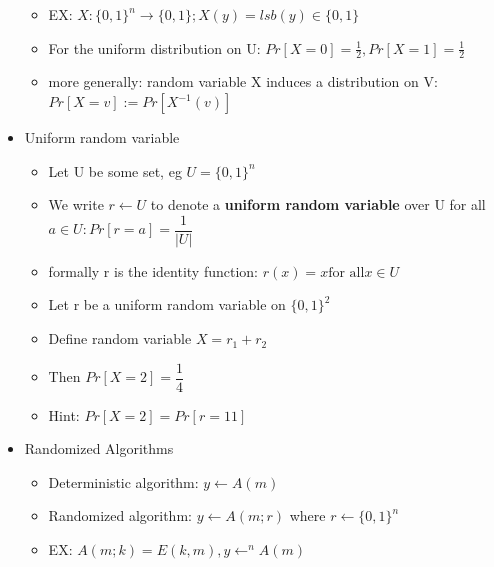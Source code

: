 \documentclass[]{article}
\begin{document}
\begin{itemize}
\begin{itemize}
		\item EX: $X: \{0,1\}^{n} \rightarrow \{0,1\} ; X(y) = lsb(y) \in \{0,1\}$
		\item For the uniform distribution on U: $Pr[X=0] = \frac{1}{2}, Pr[X=1] = \frac{1}{2}$
		\item more generally: random variable X induces a distribution on V: $Pr[X=v] := Pr[X^{-1}(v)]$
	\end{itemize}
	\item Uniform random variable
	\begin{itemize}
		\item Let U be some set, eg $U = \{0,1\}^{n}$
		\item We write $r \leftarrow U $ to denote a \textbf{uniform random variable} over U for all $a \in U: Pr[r=a] = \dfrac{1}{|U|}$
		\item formally r is the identity function: $r(x) = x \text{for all} x \in U$
		\item Let r be a uniform random variable on $\{0,1\}^{2}$
		\item Define random variable $X = r_{1} + r_{2}$
		\item Then $Pr[X=2] = \dfrac{1}{4}$
		\item Hint: $Pr[X=2] = Pr[r=11]$
	\end{itemize}
	\item Randomized Algorithms
	\begin{itemize}
		\item Deterministic algorithm: $y \leftarrow A(m)$
		\item Randomized algorithm: $y \leftarrow A(m; r)$ where $r \leftarrow \{0,1\}^{n}$
		\item EX: $A(m;k) = E(k,m), y \leftarrow^{n} A(m)$
	\end{itemize}
\end{itemize}
\end{document}
